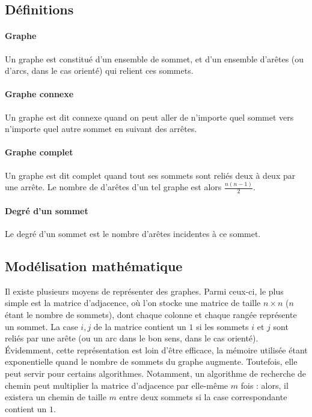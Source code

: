 \subsection{Définitions}
  \paragraph{Graphe} Un graphe est constitué d'un ensemble de sommet, et d'un
  ensemble d'arêtes (ou d'arcs, dans le cas orienté) qui relient ces sommets.

  \paragraph{Graphe connexe} Un graphe est dit connexe quand on peut aller de
  n'importe quel sommet vers n'importe quel autre sommet en suivant des
  arrêtes.

  \paragraph{Graphe complet} Un graphe est dit complet quand tout
  ses sommets sont reliés deux à deux par une arrête. Le nombre de d'arêtes
  d'un tel graphe est alors $\frac {n(n-1)} 2$.

  \paragraph{Degré d'un sommet} Le degré d'un sommet est le nombre d'arêtes
  incidentes à ce sommet.

\subsection{Modélisation mathématique}
Il existe plusieurs moyens de représenter des graphes. Parmi ceux-ci,
le plus simple est la matrice d'adjacence, où l'on stocke une matrice
de taille $n\times n$ ($n$ étant le nombre de sommets), dont chaque
colonne et chaque rangée représente un sommet. La case $i, j$ de la
matrice contient un $1$ si les sommets $i$ et $j$ sont reliés par une
arête (ou un arc dans le bon sens, dans le cas orienté). Évidemment,
cette représentation est loin d'être efficace, la mémoire utilisée
étant exponentielle quand le nombre de sommets du graphe
augmente. Toutefois, elle peut servir pour certains
algorithmes. Notamment, un algorithme de recherche de chemin peut
multiplier la matrice d'adjacence par elle-même $m$ fois : alors, il
existera un chemin de taille $m$ entre deux sommets si la case
correspondante contient un $1$.

